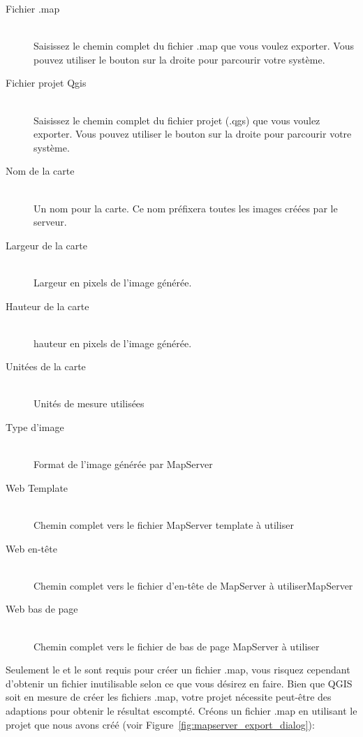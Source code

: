 \begin{description}
\item [Fichier .map] \mbox{}\\
Saisissez le chemin complet du fichier .map que vous voulez exporter. Vous pouvez utiliser le bouton sur la droite pour parcourir votre syst\`eme.
\item [Fichier projet Qgis] \mbox{}\\
Saisissez le chemin complet du fichier projet (.qgs) que vous voulez exporter. Vous pouvez utiliser le bouton sur la droite pour parcourir votre syst\`eme.
\item [Nom de la carte] \mbox{}\\
Un nom pour la carte. Ce nom pr\'efixera toutes les images cr\'e\'ees par le serveur.
\item [Largeur de la carte] \mbox{}\\
Largeur en pixels de l'image g\'en\'er\'ee.
\item [Hauteur de la carte] \mbox{}\\
hauteur en pixels de l'image g\'en\'er\'ee.
\item [Unit\'ees de la carte] \mbox{}\\
Unit\'es de mesure utilis\'ees
\item [Type d'image] \mbox{}\\
Format de l'image g\'en\'er\'ee par MapServer
\item [Web Template] \mbox{}\\
Chemin complet vers le fichier MapServer template \`a utiliser
\item [Web en-t\^ete] \mbox{}\\
Chemin complet vers le fichier d'en-t\^ete de MapServer \`a utiliserMapServer
\item [Web bas de page] \mbox{}\\
Chemin complet vers le fichier de bas de page MapServer \`a utiliser
\end{description}

Seulement le  et le  sont requis pour cr\'eer un fichier .map, vous risquez cependant d'obtenir un fichier inutilisable selon ce que vous d\'esirez en faire. Bien que QGIS soit en mesure de cr\'eer les fichiers .map, votre projet n\'ecessite peut-\^etre des adaptions pour obtenir le r\'esultat escompt\'e. Cr\'eons un fichier .map en utilisant le projet  que nous avons cr\'e\'e (voir Figure~\ref{fig:mapserver_export_dialog}):

